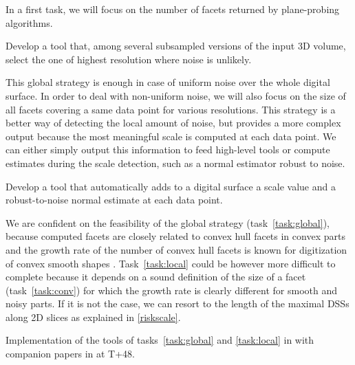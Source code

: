 
In a first task, we will focus on the number of facets returned by plane-probing algorithms.
%
\begin{Task}
  \label{task:global}
  Develop a tool that, among several subsampled versions of the input 3D volume,
  select the one of highest resolution where noise is unlikely.
\end{Task}

This global strategy is enough in case of uniform noise over the whole digital surface.  
In order to deal with non-uniform noise, we will also focus on the size of all facets
covering a same data point for various resolutions.   
This strategy is a better way of detecting the local amount of noise,
but provides a more complex output because the most meaningful scale is
computed at each data point.
We can either simply output this information to feed high-level tools
or compute estimates during the scale detection, such as a normal estimator
robust to noise.  
%
\begin{Task}
  \label{task:local}
  Develop a tool that automatically adds to a digital surface a scale value and
  a robust-to-noise normal estimate at each data point. 
\end{Task}

\Risks
We are confident on the feasibility of the global strategy (task~\ref{task:global}),
because computed facets are closely related to convex hull facets in convex parts
and the growth rate of the number of convex hull facets is known for digitization
of convex smooth shapes \cite{Barany1998}. 
Task~\ref{task:local} could be however more difficult to complete
because it depends on a sound definition of the size of a facet (task~\ref{task:conv})
for which the growth rate is clearly different for smooth and noisy parts. If it is
not the case, we can resort to the length of the maximal DSSs along 2D slices
as explained in \ref{riskscale}.

\Success
  Implementation of the tools of tasks~\ref{task:global} and \ref{task:local}
    in {\DGtalTools} with companion papers in {\IPOL} at T+48.

    

